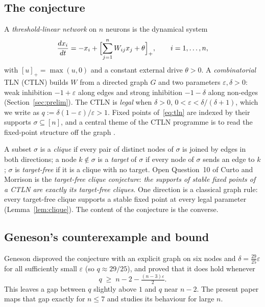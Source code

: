 \documentclass[11pt]{article}
\theoremstyle{definition}
\newcommand{\eps}{\varepsilon}
\begin{document}
\subsection{The conjecture}
A \emph{threshold-linear network} on $n$ neurons is the dynamical system
\begin{equation}\label{eq:tln}
\frac{dx_i}{dt}=-x_i+\Bigl[\sum_{j=1}^n W_{ij}x_j+\theta\Bigr]_+,\qquad i=1,\dots,n,
\end{equation}
with $[u]_+=\max(u,0)$ and a constant external drive $\theta>0$. A \emph{combinatorial} TLN (CTLN)
builds $W$ from a directed graph $G$ and two parameters $\eps,\delta>0$: weak inhibition $-1+\eps$
along edges and strong inhibition $-1-\delta$ along non-edges (Section~\ref{sec:prelim}). The CTLN is
\emph{legal} when $\delta>0$, $0<\eps<\delta/(\delta+1)$, which we write as $q:=\delta(1-\eps)/\eps>1$.
Fixed points of~\eqref{eq:tln} are indexed by their supports $\sigma\subseteq[n]$, and a central theme of
the CTLN programme is to read the fixed-point structure off the graph \cite{CurtoMorrison2023}.

A subset $\sigma$ is a \emph{clique} if every pair of distinct nodes of $\sigma$ is joined by edges in
both directions; a node $k\notin\sigma$ is a \emph{target} of $\sigma$ if every node of $\sigma$ sends an
edge to $k$; $\sigma$ is \emph{target-free} if it is a clique with no target. Open Question~10 of
Curto and Morrison \cite{CurtoMorrison2023} is the \emph{target-free clique conjecture}: \emph{the
supports of stable fixed points of a CTLN are exactly its target-free cliques.} One direction is a
classical graph rule: every target-free clique supports a stable fixed point at every legal parameter
(Lemma~\ref{lem:clique}). The content of the conjecture is the converse.

\subsection{Geneson's counterexample and bound}
Geneson \cite{Geneson2026} disproved the conjecture with an explicit graph on six nodes and
$\delta=\tfrac{29}{25}\eps$ for all sufficiently small $\eps$ (so $q\approx 29/25$), and proved
that it does hold whenever
\begin{equation}\label{eq:geneson-bound}
q\;\ge\; n-2-\tfrac{(n-3)\eps}{2}.
\end{equation}
This leaves a gap between $q$ slightly above $1$ and $q$ near $n-2$. The present paper maps that gap
exactly for $n\le7$ and studies its behaviour for large $n$.
\end{document}
